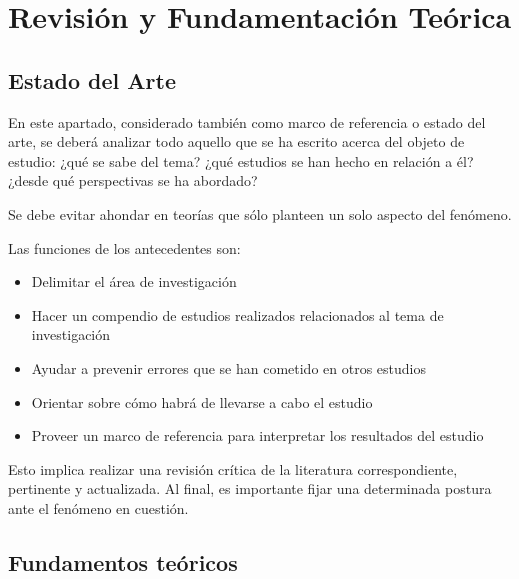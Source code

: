 \chapter{Revisión y Fundamentación Teórica}

\section{Estado del Arte}
En este apartado, considerado también como marco de referencia o estado del arte, se deberá analizar todo aquello que se ha escrito acerca del objeto de estudio: ¿qué se sabe del tema? ¿qué estudios se han hecho en relación a él? ¿desde qué perspectivas se ha abordado?\newline

Se debe evitar ahondar en teorías que sólo planteen un solo aspecto del fenómeno.\newline

Las funciones de los antecedentes son:

\begin{itemize}
    \item Delimitar el área de investigación
    \item Hacer un compendio de estudios realizados relacionados al tema de investigación
    \item Ayudar a prevenir errores que se han cometido en otros estudios
    \item Orientar sobre cómo habrá de llevarse a cabo el estudio
    \item Proveer un marco de referencia para interpretar los resultados del estudio
\end{itemize}

Esto implica realizar una revisión crítica de la literatura correspondiente, pertinente y actualizada. Al final, es importante fijar una determinada postura ante el fenómeno en cuestión.

\section{Fundamentos teóricos}
